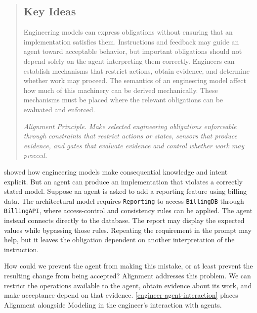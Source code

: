 




\begin{quote}
\mbox{}%
\subsection{Key Ideas}\label{heading:alignment-principle}

Engineering models can express obligations without ensuring that an implementation satisfies them. Instructions and feedback may guide an agent toward acceptable behavior, but important obligations should not depend solely on the agent interpreting them correctly. Engineers can establish mechanisms that restrict actions, obtain evidence, and determine whether work may proceed. The semantics of an engineering model affect how much of this machinery can be derived mechanically. These mechanisms must be placed where the relevant obligations can be evaluated and enforced.

\emph{Alignment Principle. Make selected engineering obligations enforceable through constraints that restrict actions or states, sensors that produce evidence, and gates that evaluate evidence and control whether work may proceed.}
\end{quote}

 showed how engineering models make consequential knowledge and intent explicit. But an agent can produce an implementation that violates a correctly stated model. Suppose an agent is asked to add a reporting feature using billing data. The architectural model requires \texttt{Reporting} to access \texttt{BillingDB} through \texttt{BillingAPI}, where access-control and consistency rules can be applied. The agent instead connects directly to the database. The report may display the expected values while bypassing those rules. Repeating the requirement in the prompt may help, but it leaves the obligation dependent on another interpretation of the instruction.

How could we prevent the agent from making this mistake, or at least prevent the resulting change from being accepted? Alignment addresses this problem. We can restrict the operations available to the agent, obtain evidence about its work, and make acceptance depend on that evidence. \autoref{engineer-agent-interaction} places Alignment alongside Modeling in the engineer's interaction with agents.

